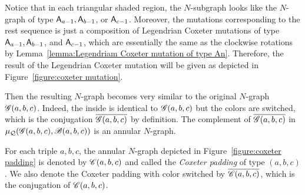 Notice that in each triangular shaded region, the $N$-subgraph looks like the $N$-graph of type $\mathsf{A}_{a-1}, \mathsf{A}_{b-1}$, or $\mathsf{A}_{c-1}$.
Moreover, the mutations corresponding to the rest sequence is just a composition 
of Legendrian Coxeter mutations of type $\mathsf{A}_{a-1},\mathsf{A}_{b-1}$, and $\mathsf{A}_{c-1}$, 
which are essentially the same as the clockwise rotations by Lemma~\ref{lemma:Legendriam Coxeter mutation of type An}.
Therefore, the result of the Legendrian Coxeter mutation will be given as depicted in 
Figure~\ref{figure:coxeter mutation}.

Then the resulting $N$-graph becomes very similar to the original $N$-graph $\mathscr{G}(a,b,c)$.
Indeed, the inside is identical to $\mathscr{G}(a,b,c)$ but the colors are switched, which is the conjugation $\overline{\mathscr{G}(a,b,c)}$ by definition.
The complement of $\overline{\mathscr{G}(a,b,c)}$ in $\mu_{\mathcal{Q}}(\mathscr{G}(a,b,c),\mathscr{B}(a,b,c))$ is an annular $N$-graph.

\begin{definition}
For each triple $a,b,c$, the annular $N$-graph depicted in Figure~\ref{figure:coxeter padding} is denoted by $\mathscr{C}(a,b,c)$ and called the \emph{Coxeter padding} of type $(a,b,c)$.
We also denote the Coxeter padding with color switched by $\overline{\mathscr{C}(a,b,c)}$, which is the conjugation of $\mathscr{C}(a,b,c)$.
\end{definition}

